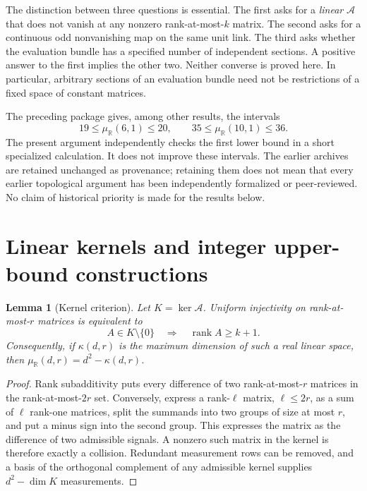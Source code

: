 \documentclass[11pt]{article}
\newtheorem{lemma}[theorem]{Lemma}
\theoremstyle{remark}\newtheorem{remark}[theorem]{Remark}
\newcommand{\R}{\mathbb R}\newcommand{\C}{\mathbb C}\newcommand{\Q}{\mathbb Q}
\newcommand{\rank}{\operatorname{rank}}\newcommand{\ch}{\operatorname{ch}}
\begin{document}
The distinction between three questions is essential. The first asks for a
\emph{linear} $\mathcal A$ that does not vanish at any nonzero rank-at-most-$k$
matrix. The second asks for a continuous odd nonvanishing map on the same unit
link. The third asks whether the evaluation bundle has a specified number of
independent sections. A positive answer to the first implies the other two.
Neither converse is proved here. In particular, arbitrary sections of an
evaluation bundle need not be restrictions of a fixed space of constant matrices.

The preceding package gives, among other results, the intervals
\[
19\le\mu_\R(6,1)\le20,\qquad
35\le\mu_\R(10,1)\le36.
\]
The present argument independently checks the first lower bound in a short
specialized calculation. It does not improve these intervals. The earlier
archives are retained unchanged as provenance; retaining them does not mean that
every earlier topological argument has been independently formalized or
peer-reviewed. No claim of historical priority is made for the results below.

\section{Linear kernels and integer upper-bound constructions}
\begin{lemma}[Kernel criterion]\label{kernel}
Let $K=\ker\mathcal A$. Uniform injectivity on rank-at-most-$r$ matrices is
equivalent to
\[
 A\in K\setminus\{0\}\quad\Longrightarrow\quad\rank A\ge k+1.
\]
Consequently, if $\kappa(d,r)$ is the maximum dimension of such a real linear
space, then $\mu_\R(d,r)=d^2-\kappa(d,r)$.
\end{lemma}
\begin{proof}
Rank subadditivity puts every difference of two rank-at-most-$r$ matrices in the
rank-at-most-$2r$ set. Conversely, express a rank-$\ell$ matrix, $\ell\le2r$,
as a sum of $\ell$ rank-one matrices, split the summands into two groups of size
at most $r$, and put a minus sign into the second group. This expresses the
matrix as the difference of two admissible signals. A nonzero such matrix in the
kernel is therefore exactly a collision. Redundant measurement rows can be
removed, and a basis of the orthogonal complement of any admissible kernel
supplies $d^2-\dim K$ measurements.
\end{proof}
\end{document}
